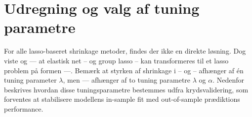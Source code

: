 \section{Udregning og valg af tuning parametre}
For alle lasso-baseret shrinkage metoder, findes der ikke en direkte løsning.
Dog viste \citep{zou_hastie} og --- at elastisk net -- og group lasso -- kan transformeres til et lasso problem på formen ---.
Bemærk at styrken af shrinkage i -- og -- afhænger af én tuning parameter \(\lambda\), men --- afhænger af to tuning parametre \(\lambda\) og \(\alpha\).
Nedenfor beskrives hvordan disse tuningsparametre bestemmes udfra krydsvalidering, som forventes at stabilisere modellens in-sample fit med out-of-sample prædiktions performance.

